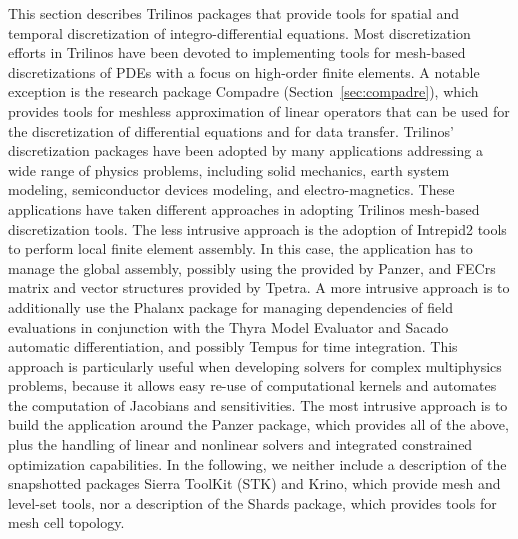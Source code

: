 
This section describes Trilinos packages that provide tools for spatial and temporal discretization of integro-differential equations. Most discretization efforts in Trilinos have been devoted to implementing tools for mesh-based discretizations of PDEs with a focus on high-order finite elements. A notable exception is the research package Compadre (Section~\ref{sec:compadre}), which provides tools for meshless approximation of linear operators that can be used for the discretization of differential equations and for data transfer.
Trilinos' discretization packages have been adopted by many applications addressing a wide range of physics problems, including solid mechanics, earth system modeling, semiconductor devices modeling, and electro-magnetics. These applications have taken different approaches in adopting Trilinos mesh-based discretization tools. The less intrusive approach is the adoption of Intrepid2 tools to perform local finite element assembly. In this case, the application has to manage the global assembly, possibly using the  provided by Panzer, and FECrs matrix and vector structures provided by Tpetra.
A more intrusive approach is to additionally use the Phalanx package for managing dependencies of field evaluations in conjunction with the Thyra Model Evaluator and Sacado automatic differentiation, and possibly Tempus for time integration. This approach is particularly useful when developing solvers for complex multiphysics problems, because it allows easy re-use of computational kernels and automates the computation of Jacobians and sensitivities.
The most intrusive approach is to build the application around the Panzer package, which provides all of the above, plus the handling of linear and nonlinear solvers and integrated constrained optimization capabilities.
In the following, we neither include a description of the snapshotted packages Sierra ToolKit (STK) and Krino, which provide mesh and level-set tools, nor a description of the Shards package, which provides tools for mesh cell topology.

